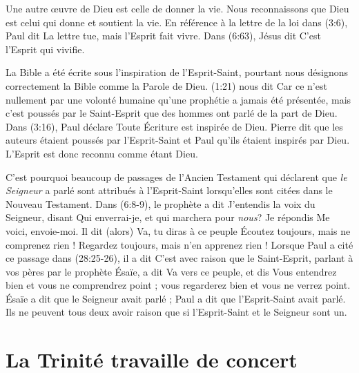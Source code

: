 Une autre œuvre de Dieu est celle de donner la vie. Nous reconnaissons que Dieu
 est celui qui donne et soutient la vie.
 En référence à la lettre de la loi dans (3:6),
 Paul dit\frcolon{} \Og La lettre tue, mais l'Esprit fait vivre. \Fg{}
 Dans (6:63), Jésus dit\frcolon{} \Og C'est l'Esprit qui vivifie.\Fg{}

La Bible a été écrite sous l'inspiration de l'Esprit-Saint, pourtant nous
 désignons correctement la Bible comme la Parole de Dieu.
 (1:21) nous dit\frcolon{}
 \Og Car ce n'est nullement par une volonté humaine qu'une prophétie a jamais
 été présentée, mais c'est poussés par le Saint-Esprit que des hommes ont parlé
 de la part de Dieu. \Fg{}
 Dans (3:16), Paul déclare\frcolon{}
 \Og Toute Écriture est inspirée de Dieu. \Fg{}
 Pierre dit que les auteurs étaient poussés par l'Esprit-Saint et Paul qu'ils
 étaient inspirés par Dieu. L'Esprit est donc reconnu comme étant Dieu.

C'est pourquoi beaucoup de passages de l'Ancien Testament qui déclarent que
 \emph{le Seigneur} a parlé sont attribués à l'Esprit-Saint lors\-qu'elles
 sont citées dans le Nouveau Testament.
 Dans (6:8-9), le prophète a dit\frcolon{} \Og J'entendis la voix du
 Seigneur, disant\frcolon{} Qui enverrai-je, et qui marchera pour \emph{nous}? Je répondis\frcolon{}
 Me voici, envoie-moi. Il dit (alors)\frcolon{} Va, tu diras à ce peuple\frcolon{}
 Écoutez toujours, mais ne comprenez rien ! Regardez toujours, mais n'en
 apprenez rien ! \Fg{}
 Lorsque Paul a cité ce passage dans (28:25-26), il a dit\frcolon{}
 \Og C'est avec raison que le Saint-Esprit, parlant à vos pères par le
 prophète Ésaïe, a dit\frcolon{} Va vers ce peuple, et dis\frcolon{} Vous entendrez bien et
 vous ne comprendrez point ; vous regarderez bien et vous ne verrez point. \Fg{}
 Ésaïe a dit que le Seigneur avait parlé ; Paul a dit que l'Esprit-Saint
 avait parlé.
 Ils ne peuvent tous deux avoir raison que si l'Esprit-Saint et le Seigneur sont un.


\section{La Trinit\'e travaille de concert}

